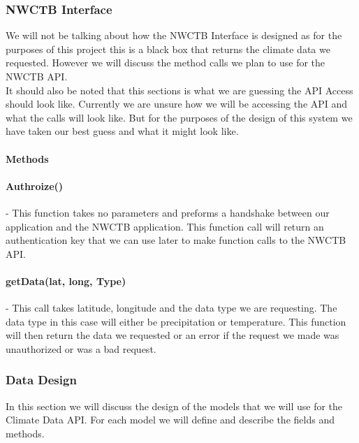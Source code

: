 \documentclass[onecolumn, draftclsnofoot,10pt, compsoc]{article}
\begin{document}
					
					
				\subsubsection{NWCTB Interface}
					We will not be talking about how the NWCTB Interface is designed as for the purposes of this project this is a black box that returns the climate data we requested. However we will discuss the method calls we plan to use for the NWCTB API.\\
					
					It should also be noted that this sections is what we are guessing the API Access should look like. Currently we are unsure how we will be accessing the API and what the calls will look like. But for the purposes of the design of this system we have taken our best guess and what it might look like.\\
					
					\paragraph{\textbf{Methods}}
					
					
					\paragraph{Authroize()} - This function takes no parameters and preforms a handshake between our application and the NWCTB application. This function call will return an authentication key that we can use later to make function calls to the NWCTB API.\\ 
					\paragraph{getData(lat, long, Type)} - This call takes latitude, longitude and the data type we are requesting. The data type in this case will either be precipitation or temperature. This function will then return the data we requested or an error if the request we made was unauthorized or was a bad request.\\
					

			\subsubsection{Data Design}
			In this section we will discuss the design of the models that we will use for the Climate Data API. For each model we will define and describe the fields and methods.\\
			
\end{document}
